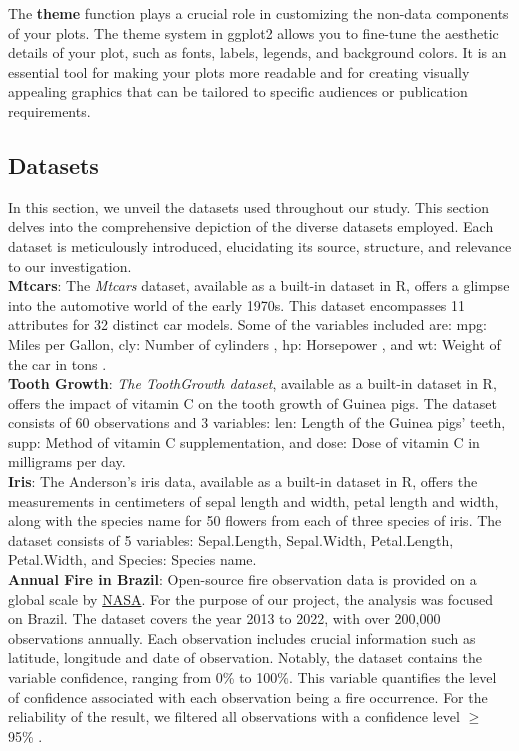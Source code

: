 \documentclass{article}\usepackage[]{graphicx}\usepackage[]{xcolor}
\begin{document}
\noindent
The \textbf{theme} function plays a crucial role in customizing the non-data components of your plots. The theme system in ggplot2 allows you to fine-tune the aesthetic details of your plot, such as fonts, labels, legends, and background colors. It is an essential tool for making your plots more readable and for creating visually appealing graphics that can be tailored to specific audiences or publication requirements.

\subsection{Datasets}
In this section, we unveil the datasets used throughout our study. This section delves into the comprehensive depiction of the diverse datasets employed. Each dataset is meticulously introduced, elucidating its source, structure, and relevance to our investigation.\\

\noindent
\textbf{Mtcars}: The \textit{Mtcars} dataset, available as a built-in dataset in R, offers a glimpse into the automotive world of the early 1970s. This dataset encompasses 11 attributes for 32 distinct car models. Some of the variables included are: mpg: Miles per Gallon, cly: Number of cylinders , hp: Horsepower , and wt: Weight of the car in tons .\\

\noindent
\textbf{Tooth Growth}: \textit{The ToothGrowth dataset}, available as a built-in dataset in R, offers the impact of vitamin C on the tooth growth of Guinea pigs. The dataset consists of 60 observations and 3 variables: len: Length of the Guinea pigs' teeth, supp: Method of vitamin C supplementation, and dose: Dose of vitamin C in milligrams per day.\\

\noindent
\textbf{Iris}: The Anderson's iris data, available as a built-in dataset in R, offers the measurements in centimeters of sepal length and width, petal length and width, along with the species name for 50 flowers from each of three species of iris. The dataset consists of 5 variables: Sepal.Length, Sepal.Width, Petal.Length, Petal.Width, and Species: Species name.\\

\noindent
\textbf{Annual Fire in Brazil}: Open-source fire observation data is provided on a global scale by \href{https://firms.modaps.eosdis.nasa.gov/}{NASA}. For the purpose of our project, the analysis was focused on Brazil. The dataset covers the year 2013 to 2022, with over 200,000 observations annually. Each observation includes crucial information such as latitude, longitude and date of observation. Notably, the dataset contains the variable confidence, ranging from 0\% to 100\%. This variable quantifies the level of confidence associated with each observation being a fire occurrence. For the reliability of the result, we filtered all observations with a confidence level $\ge$ 95\% \cite{nasa_confidence}.\\
\end{document}

